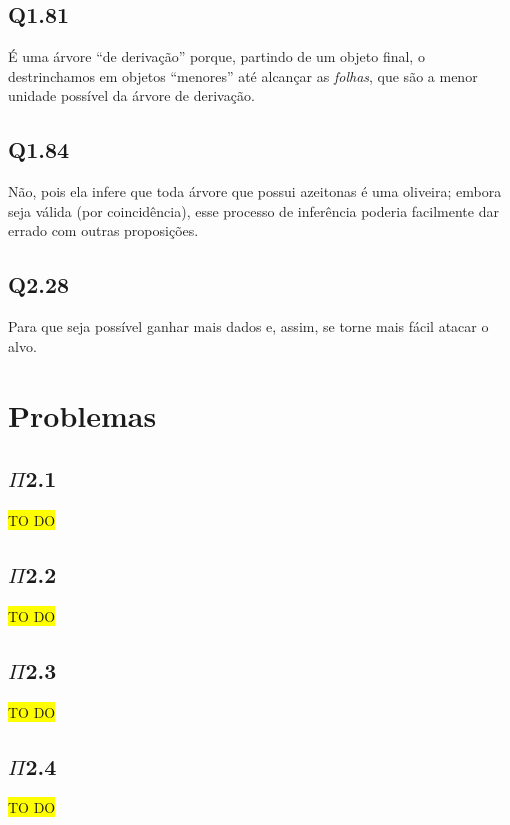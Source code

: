 \documentclass[portuguese,a4paper,12pt]{article}
\begin{document}
	\subsection*{Q1.81}
	
	É uma árvore ``de derivação'' porque, partindo de um objeto final, o destrinchamos em objetos ``menores'' até alcançar as \textit{folhas}, que são a menor unidade possível da árvore de derivação.
	
	\subsection*{Q1.84}
	
	Não, pois ela infere que toda árvore que possui azeitonas é uma oliveira; embora seja válida (por coincidência), esse processo de inferência poderia facilmente dar errado com outras proposições.
	
	\subsection*{Q2.28}
	
	Para que seja possível ganhar mais dados e, assim, se torne mais fácil atacar o alvo.
	
	\section*{\centering Problemas}
	
	\subsection*{$\Pi$2.1}
	
	\colorbox{yellow}{TO DO}
	
	\subsection*{$\Pi$2.2}
	
	\colorbox{yellow}{TO DO}
	
	\subsection*{$\Pi$2.3}
	
	\colorbox{yellow}{TO DO}
	
	\subsection*{$\Pi$2.4}
	
	\colorbox{yellow}{TO DO}
\end{document}
